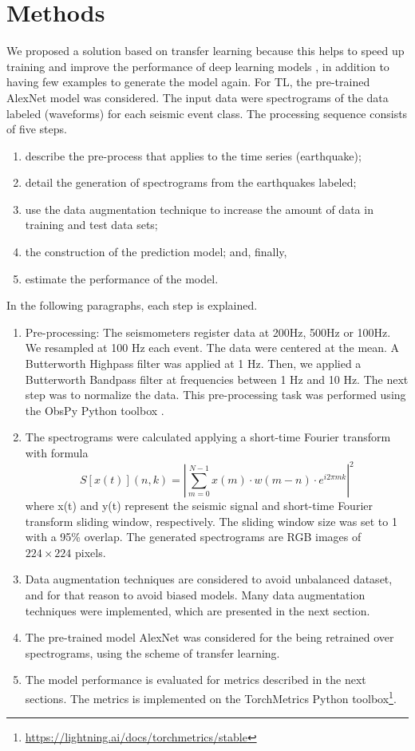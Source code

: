 \documentclass[journal]{IEEEtran}
\begin{document}
\section{Methods}\label{methods}
We proposed a solution based on transfer learning because this helps to speed up training and improve the performance of deep learning models \cite{titos2019classification,bueno2019volcano}, in addition to having few examples to generate the model again. For TL, the pre-trained AlexNet\cite{krizhevsky2012imagenet} model was considered.
The input data were spectrograms of the data labeled (waveforms) for each seismic event class. The processing sequence consists of five steps.
\begin{enumerate}
 \item describe the pre-process that applies to the time series (earthquake);
 \item detail the generation of spectrograms from the earthquakes labeled;
 \item use the data augmentation technique to increase the amount of data in training and test data sets;
 \item the construction of the prediction model; and, finally,
 \item estimate the performance of the model.
\end{enumerate}
In the following paragraphs, each step is explained.
\begin{enumerate}
  \item Pre-processing: The seismometers register data at 200Hz, 500Hz or 100Hz. We resampled at 100 Hz each event. The data were centered at the mean. A Butterworth Highpass filter was applied at 1 Hz. Then, we applied a Butterworth Bandpass filter at frequencies between 1 Hz and 10 Hz. The next step was to normalize the data. This pre-processing task was performed using the ObsPy Python toolbox \cite{beyreuther2010obspy}.
  \item The spectrograms were calculated applying a short-time Fourier transform with formula
  \begin{equation}
    S[x(t)](n,k)=\left|\sum_{m=0}^{N-1}x(m)\cdot w(m-n)\cdot e^{i2\pi mk}\right|^2
  \end{equation}
where x(t) and y(t) represent the seismic signal and short-time Fourier transform sliding window, respectively. The sliding window size was set to 1 with a 95\% overlap. The generated spectrograms are RGB images of $224\times224$ pixels.
  \item Data augmentation techniques are considered to avoid unbalanced dataset, and for that reason to avoid biased models. Many data augmentation techniques were implemented, which are presented in the next section.
  \item The pre-trained model AlexNet\cite{krizhevsky2012imagenet} was considered for the being retrained over spectrograms, using the scheme of transfer learning.
  \item The model performance is evaluated for metrics described in the next sections. The metrics is implemented on the TorchMetrics Python toolbox\footnote{\href{https://lightning.ai/docs/torchmetrics/stable}{\color{blue}https://lightning.ai/docs/torchmetrics/stable}}.
\end{enumerate}
\end{document}
